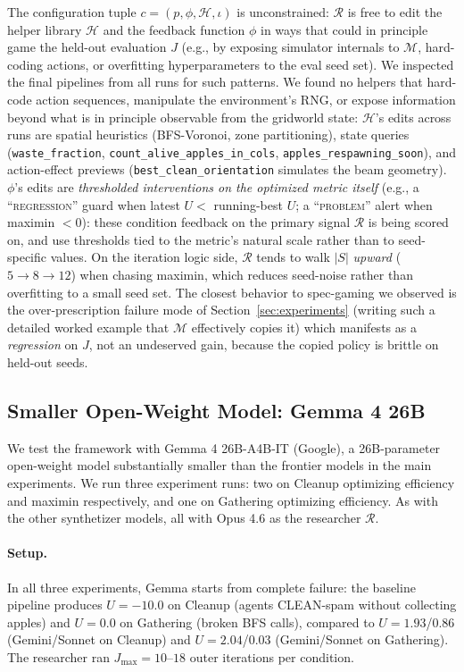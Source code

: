 \documentclass{article}
\newcommand{\cR}{\mathcal{R}}
\begin{document}
The configuration tuple $c=(p,\phi,\mathcal{H},\iota)$ is unconstrained: $\cR$ is free to edit the helper library $\mathcal{H}$ and the feedback function $\phi$ in ways that could in principle game the held-out evaluation $J$ (e.g., by exposing simulator internals to $\mathcal{M}$, hard-coding actions, or overfitting hyperparameters to the eval seed set). We inspected the final pipelines from all runs for such patterns. We found no helpers that hard-code action sequences, manipulate the environment's RNG, or expose information beyond what is in principle observable from the gridworld state: $\mathcal{H}$'s edits across runs are spatial heuristics (BFS-Voronoi, zone partitioning), state queries (\texttt{waste\_fraction}, \texttt{count\_alive\_apples\_in\_cols}, \texttt{apples\_respawning\_soon}), and action-effect previews (\texttt{best\_clean\_orientation} simulates the beam geometry). $\phi$'s edits are \emph{thresholded interventions on the optimized metric itself} (e.g., a ``\textsc{regression}'' guard when latest $U <$ running-best $U$; a ``\textsc{problem}'' alert when maximin $< 0$): these condition feedback on the primary signal $\cR$ is being scored on, and use thresholds tied to the metric's natural scale rather than to seed-specific values. On the iteration logic side, $\cR$ tends to walk $|S|$ \emph{upward} ($5{\to}8{\to}12$) when chasing maximin, which reduces seed-noise rather than overfitting to a small seed set. The closest behavior to spec-gaming we observed is the over-prescription failure mode of Section~\ref{sec:experiments} (writing such a detailed worked example that $\mathcal{M}$ effectively copies it) which manifests as a \emph{regression} on $J$, not an undeserved gain, because the copied policy is brittle on held-out seeds.

\subsection{Smaller Open-Weight Model: Gemma 4 26B}
\label{app:gemma}

We test the framework with Gemma 4 26B-A4B-IT (Google), a 26B-parameter open-weight model substantially smaller than the frontier models in the main experiments. We run three experiment runs: two on Cleanup optimizing efficiency and maximin respectively, and one on Gathering optimizing efficiency. As with the other synthetizer models, all with Opus 4.6 as the researcher $\cR$.

\paragraph{Setup.} In all three experiments, Gemma starts from complete failure: the baseline pipeline produces $U{=}{-}10.0$ on Cleanup (agents CLEAN-spam without collecting apples) and $U{=}0.0$ on Gathering (broken BFS calls), compared to $U{=}1.93$/$0.86$ (Gemini/Sonnet on Cleanup) and $U{=}2.04$/$0.03$ (Gemini/Sonnet on Gathering). The researcher ran $J_{\max}{=}10$--$18$ outer iterations per condition.
\end{document}
